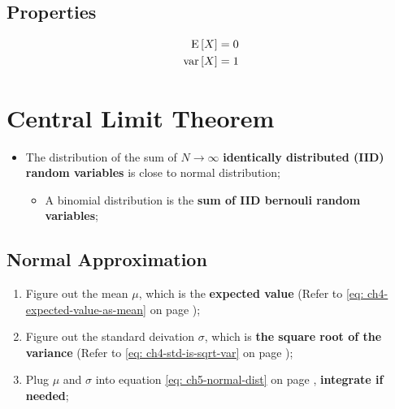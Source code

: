   \subsection{Properties}

    \begin{align}
      \operatorname{E} \left[ X \right] &= 0 \\
      \operatorname{var} \left[ X \right] &= 1
    \end{align}
    
\section{Central Limit Theorem}

  \begin{itemize}
    \item The distribution of the sum of $ N \to \infty $ \textbf{identically distributed (IID) random variables} is close to normal distribution;
    \begin{itemize}
      \item A binomial distribution is the \textbf{sum of IID bernouli random variables};
    \end{itemize}
  \end{itemize}
  
  \subsection{Normal Approximation}
  
    \begin{enumerate}
      \item Figure out the mean $ \mu $, which is the \textbf{expected value} (Refer to \ref{eq: ch4-expected-value-as-mean} on page \pageref{eq: ch4-expected-value-as-mean});
      \item Figure out the standard deivation $ \sigma $, which is \textbf{the square root of the variance} (Refer to \ref{eq: ch4-std-is-sqrt-var} on page \pageref{eq: ch4-std-is-sqrt-var});
      \item Plug $ \mu $ and $ \sigma $ into equation \ref{eq: ch5-normal-dist} on page \pageref{eq: ch5-normal-dist}, \textbf{integrate if needed};
    \end{enumerate}